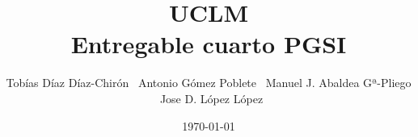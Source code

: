 \documentclass[a4paper,12pt]{article}
\title{UCLM
  \\
  \vspace*{7mm}  Entregable cuarto PGSI}
\author{Tobías Díaz Díaz-Chirón \ Antonio Gómez Poblete \ Manuel
  J. Abaldea Gª-Pliego \ Jose D. López López}
\date{\today}
\begin{document}

\newpage

\newpage
\pagestyle{fancy}

\tableofcontents
\newpage

\label{sec:introduccion}


\label{sec:identificacion}


\label{sec:magnitud}


\label{sec:contingencia}

\clearpage

% 

%   
\end{document}
